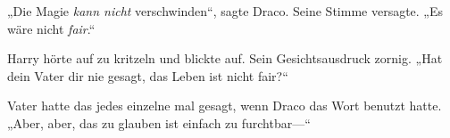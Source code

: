 „Die Magie \emph{kann nicht} verschwinden“, sagte Draco. Seine Stimme versagte. „Es wäre nicht \emph{fair}.“

Harry hörte auf zu kritzeln und blickte auf. Sein Gesichtsausdruck zornig. „Hat dein Vater dir nie gesagt, das Leben ist nicht fair?“

Vater hatte das jedes einzelne mal gesagt, wenn Draco das Wort benutzt hatte. „Aber, aber, das zu glauben ist einfach zu furchtbar—“

